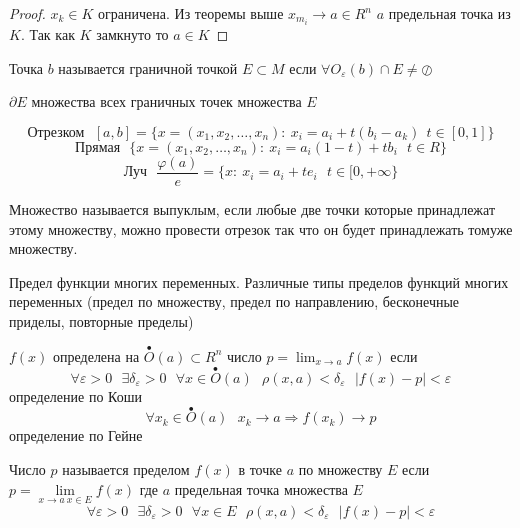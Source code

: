 \begin{proof}
  $x_k \in K$ ограничена. Из теоремы выше $x_{m_i} \to a \in R^n$ $a$
  предельная точка из $K$. Так как $K$ замкнуто то $a \in K$
\end{proof}

\begin{define}
  Точка $b$ называется граничной точкой $E \subset M$ если
  $\forall O_{\varepsilon}(b)\cap E \not= \oslash$

  $\partial E$ множества всех граничных точек множества $E$
\end{define}

\begin{define}
  $$
  \text{Отрезком} ~~~ [a,b] = \{ x = (x_1, x_2, \ldots, x_n): ~
  x_i = a_i + t(b_i - a_k) ~~ t \in [0,1]\}
  $$
  $$
  \text{Прямая} ~~~ \{ x = (x_1, x_2, \ldots, x_n): ~ x_i = a_i(1 - t) +
  tb_i ~~~ t \in R \}
  $$
  $$
  \text{Луч} ~~~ \frac{\varphi(a)}{e} = \{ x: ~ x_i = a_i + te_i ~~~
  t \in [0, + \infty\}
  $$
\end{define}

\begin{define}
  Множество называется выпуклым, если любые две точки которые принадлежат этому
  множеству, можно провести отрезок так что он будет принадлежать томуже
  множеству.
\end{define}

\begin{title}[\Large]
  Предел функции многих переменных. Различные типы пределов функций многих
  переменных (предел по множеству, предел по направлению, бесконечные приделы,
  повторные пределы)
\end{title}

\begin{define}
  $f(x)$ определена на $\stackrel{\bullet}{O}(a) \subset R^n$ число
  $p = \lim_{x \to a} f(x)$ если
  $$
  \forall \varepsilon > 0 ~~~ \exists \delta_{\varepsilon} > 0 ~~~
  \forall x \in \stackrel{\bullet}{O}(a) ~~~ \rho(x, a) < \delta_{\varepsilon}
  ~~~ |f(x) - p| < \varepsilon
  $$
  определение по Коши
  $$
  \forall x_k \in \stackrel{\bullet}{O}(a) ~~~ x_k \to a \Rightarrow
  f(x_k) \to p
  $$
  определение по Гейне
\end{define}

\begin{define}
  Число $p$ называется пределом $f(x)$ в точке $a$ по множеству $E$ если
  $p = \lim \limits_{x \to a ~ x \in E} f(x)$ где $a$ предельная точка
  множества $E$
  $$
  \forall \varepsilon > 0 ~~~ \exists \delta_{\varepsilon} > 0 ~~~
  \forall x \in E ~~~ \rho(x, a) < \delta_{\varepsilon} ~~~
  |f(x) - p| < \varepsilon
  $$
\end{define}

